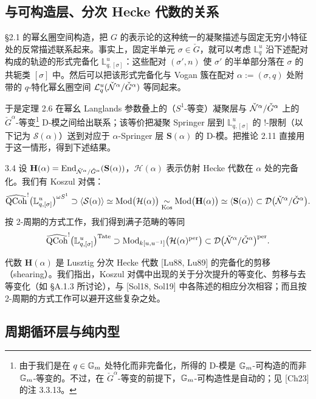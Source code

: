 \subsection{与可构造层、分次 Hecke 代数的关系}
§2.1 的幂幺圈空间构造，把 $G$ 的表示论的这种统一的凝聚描述与固定无穷小特征处的反常描述联系起来。事实上，固定半单元 $\sigma\in\check G$，就可以考虑 $\mathbb L^u_q$ 沿下述配对构成的轨迹的形式完备化 $\mathbb L^u_{q,[\sigma]}$：这些配对 $(\sigma',n)$ 使 $\sigma'$ 的半单部分落在 $\sigma$ 的共轭类 $[\sigma]$ 中。然后可以把该形式完备化与 Vogan 簇在配对 $\alpha:=(\sigma,q)$ 处附带的 $q$-特化幂幺圈空间 $\mathcal{L}^u_q(\check{\mathcal{N}}^\alpha/\check G^\alpha)$ 等同起来。

于是定理 2.6 在幂幺 Langlands 参数叠上的（$S^1$-等变）凝聚层与 $\check{\mathcal{N}}^\alpha/\check G^\alpha$ 上的 $\check G^\alpha$-等变\footnote{由于我们是在 $q\in\mathbb{G}_m$ 处特化而非完备化，所得的 D-模是 $\mathbb{G}_m$-可构造的而非 $\mathbb{G}_m$-等变的。不过，在 $\check G^\alpha$-等变的前提下，$\mathbb{G}_m$-可构造性是自动的；见 [Ch23] 的注 3.3.13。} D-模之间给出联系；该等价把凝聚 Springer 层到 $\mathbb L^u_{q,[\sigma]}$ 的 !-限制（以下记为 $\mathcal S(\alpha)$）送到对应于 $\alpha$-Springer 层 $\mathbf S(\alpha)$ 的 D-模。把推论 2.11 直接用于这一情形，得到下述结果。

\begin{thm}{3.4}\label{thm:a5-02-9}
设 $\mathbf H(\alpha)=\operatorname{End}_{\check{\mathcal{N}}^\alpha/\check G^\alpha}(\mathbf S(\alpha))$，$\mathcal H(\alpha)$ 表示仿射 Hecke 代数在 $\alpha$ 处的完备化。我们有 Koszul 对偶：
\[
\widehat{\operatorname{QCoh}}^{!}\bigl(\mathbb L^u_{q,[\sigma]}\bigr)^{\omega S^1}\supset\langle\mathcal S(\alpha)\rangle
\simeq\operatorname{Mod}\bigl(\mathcal H(\alpha)\bigr)\underset{\mathrm{Kos}}{\sim}\operatorname{Mod}\bigl(\mathbf H(\alpha)\bigr)
\simeq\langle\mathbf S(\alpha)\rangle\subset\mathcal{D}\bigl(\check{\mathcal{N}}^\alpha/\check G^\alpha\bigr).
\]
按 2-周期的方式工作，我们得到满子范畴的等同
\[
\widehat{\operatorname{QCoh}}^{!}\bigl(\mathbb L^u_{q,[\sigma]}\bigr)^{\mathrm{Tate}}\supset
\operatorname{Mod}_{k[u,u^{-1}]}\bigl(\mathcal H(\alpha)^{\mathrm{per}}\bigr)\subset\mathcal{D}\bigl(\check{\mathcal{N}}^\alpha/\check G^\alpha\bigr)^{\mathrm{per}}.
\]
\end{thm}

代数 $\mathbf H(\alpha)$ 是 Lusztig 分次 Hecke 代数 [Lu88, Lu89] 的完备化的剪移（shearing）。我们指出，Koszul 对偶中出现的关于分次提升的等变化、剪移与去等变化（如 §A.1.3 所讨论），与 [Sol18, Sol19] 中各陈述的相应分次相容；而且按 2-周期的方式工作可以避开这些复杂之处。

\subsection{周期循环层与纯内型}
